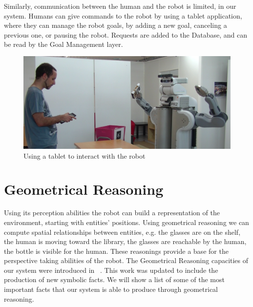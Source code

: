 Similarly, communication between the human and the robot is limited, in our system. Humans can give commands to the robot by using a tablet application, where they can manage the robot goals, by adding a new goal, canceling a previous one, or pausing the robot. Requests are added to the Database, and can be read by the Goal Management layer. 

 \begin{figure}[ht!]
	\centering
	\includegraphics[scale=0.2]{img/situation_assessment/tablet.pdf}
	\caption{Using a tablet to interact with the robot}
	\label{fig:situation_assessment-explore}
\end{figure}

\section{Geometrical Reasoning}
\label{sec:situation_assessment-geometrical_reasoning}

Using its perception abilities the robot can build a representation of the environment, starting with entities' positions. Using geometrical reasoning we can compute spatial relationships between entities, e.g. the glasses are on the shelf, the human is moving toward the library, the glasses are reachable by the human, the bottle is visible for the human. These reasonings provide a base for the perspective taking abilities of the robot.  The Geometrical Reasoning capacities of our system were introduced in ~\cite{Sisbot2011}. This work was updated to include the production of new symbolic facts. We will show a list of some of the most important facts that our system is able to produce through geometrical reasoning.

